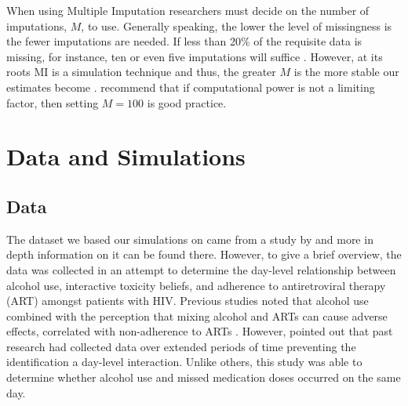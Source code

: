 \documentclass{svjour3}                     %
\begin{document}
When using Multiple Imputation researchers must decide on the number of imputations, $M$, to use. Generally speaking, the lower the level of missingness is the fewer imputations are needed. If less than 20\% of the requisite data is missing, for instance, ten or even five imputations will suffice \citep{raghunathan2015missing}. However, at its roots MI is a simulation technique and thus, the greater $M$ is the more stable our estimates become \citep{harel2007inferences}. \citet{graham2007many} recommend that if computational power is not a limiting factor, then setting $M=100$ is good practice. \par


\section{Data and Simulations}
\label{sec:2}
\subsection{Data}
\label{sec:2.1}
The dataset we based our simulations on came from a study by \citet{pellowski2016alcohol} and more in depth information on it can be found there. However, to give a brief overview, the data was collected in an attempt to determine the day-level relationship between alcohol use, interactive toxicity beliefs, and adherence to antiretroviral therapy (ART) amongst patients with HIV. Previous studies noted that alcohol use combined with the perception that mixing alcohol and ARTs can cause adverse effects, correlated with non-adherence to ARTs \citep{kalichman2009prevalence, kalichman2012alcohol}. However, \citet{pellowski2016alcohol} pointed out that past research had collected data over extended periods of time preventing the identification a day-level interaction. Unlike others, this study was able to determine whether alcohol use and missed medication doses occurred on the same day. \par
\end{document}
